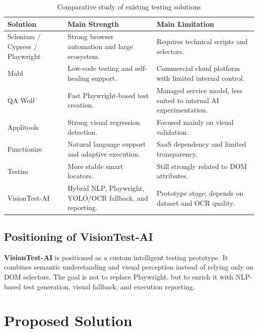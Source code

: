 \begin{table}[H]
	\centering
	\caption{Comparative study of existing testing solutions}
	\label{tab:existing_solutions_comparison}
	\renewcommand{\arraystretch}{1.25}
	\small
	\begin{tabularx}{\textwidth}{|l|X|X|}
		\hline
		\rowcolor{gray!20}
		\textbf{Solution} & \textbf{Main Strength} & \textbf{Main Limitation} \\ \hline
		Selenium / Cypress / Playwright & Strong browser automation and large ecosystem. & Requires technical scripts and selectors. \\ \hline
		Mabl & Low-code testing and self-healing support. & Commercial cloud platform with limited internal control. \\ \hline
		QA Wolf & Fast Playwright-based test creation. & Managed service model, less suited to internal AI experimentation. \\ \hline
		Applitools & Strong visual regression detection. & Focused mainly on visual validation. \\ \hline
		Functionize & Natural language support and adaptive execution. & SaaS dependency and limited transparency. \\ \hline
		Testim & More stable smart locators. & Still strongly related to DOM attributes. \\ \hline
		VisionTest-AI & Hybrid NLP, Playwright, YOLO/OCR fallback, and reporting. & Prototype stage; depends on dataset and OCR quality. \\ \hline
	\end{tabularx}
\end{table}

\subsection{Positioning of VisionTest-AI}
\label{subsec:visiontest_positioning}

\textbf{VisionTest-AI} is positioned as a custom intelligent testing prototype. It combines semantic understanding and visual perception instead of relying only on DOM selectors. The goal is not to replace Playwright, but to enrich it with NLP-based test generation, visual fallback, and execution reporting.

\section{Proposed Solution}
\label{sec:proposed_solution_ch1}

